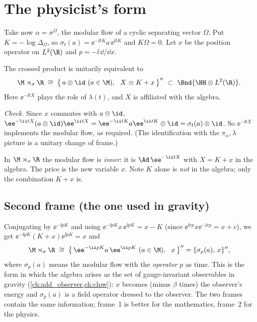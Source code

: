 \section{The physicist's form}

Take now $\alpha=\sigma^\Omega$, the modular flow of a cyclic separating vector $\Omega$. Put $K=-\log\Delta_\Omega$, so $\sigma_t(a)=\ee^{-\ii tK}a\,\ee^{\ii tK}$ and $K\Omega=0$. Let $x$ be the position operator on $L^2(\R)$ and $p=-\ii\,\dd/\dd x$.

\begin{proposition}
The crossed product is unitarily equivalent to
\begin{equation}
\M\rtimes_\sigma\R\;\cong\;\big\{\,a\otimes\id\ (a\in\M),\ \ X\equiv K+x\,\big\}''\ \subset\ \Bnd{\HH\otimes L^2(\R)}.
\end{equation}
Here $\ee^{-\ii tX}$ plays the role of $\lambda(t)$, and $X$ is affiliated with the algebra.
\end{proposition}
\emph{Check.} Since $x$ commutes with $a\otimes\id$, $\ee^{-\ii tX}(a\otimes\id)\ee^{\ii tX}=\ee^{-\ii tK}a\ee^{\ii tK}\otimes\id=\sigma_t(a)\otimes\id$. So $\ee^{-\ii tX}$ implements the modular flow, as required. (The identification with the $\pi_\alpha,\lambda$ picture is a unitary change of frame.)

\begin{keyidea}
In $\M\rtimes_\sigma\R$ the modular flow is \emph{inner}: it is $\Ad\,\ee^{-\ii tX}$ with $X=K+x$ in the algebra. The price is the new variable $x$. Note $K$ alone is \emph{not} in the algebra; only the combination $K+x$ is.
\end{keyidea}

\subsection*{Second frame (the one used in gravity)}
Conjugating by $\ee^{-\ii pK}$ and using $\ee^{-\ii pK}x\,\ee^{\ii pK}=x-K$ (since $\ee^{\ii cp}x\ee^{-\ii cp}=x+c$), we get $\ee^{-\ii pK}(K+x)\ee^{\ii pK}=x$ and
\begin{equation}
\M\rtimes_\sigma\R\;\cong\;\big\{\,\ee^{-\ii pK}a\,\ee^{\ii pK}\ (a\in\M),\ \ x\,\big\}''=\{\sigma_p(a),\,x\}'',\label{eq:frame2}
\end{equation}
where $\sigma_p(a)$ means the modular flow with the \emph{operator} $p$ as time. This is the form in which the algebra arises as the set of gauge-invariant observables in gravity (\cref{ch:add_observer,ch:clpw}): $x$ becomes (minus $\beta$ times) the observer's energy and $\sigma_p(a)$ is a field operator dressed to the observer. The two frames contain the same information; frame~1 is better for the mathematics, frame~2 for the physics.

